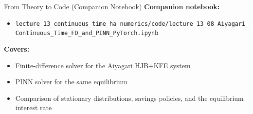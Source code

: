 \documentclass[aspectratio=169,11pt]{beamer}
\begin{document}
\begin{frame}{From Theory to Code (Companion Notebook)}
\footnotesize
\textbf{Companion notebook:}
\begin{itemize}\itemsep2pt
    \item \texttt{lecture\_13\_continuous\_time\_ha\_numerics/code/\allowbreak lecture\_13\_08\_Aiyagari\_Continuous\_Time\_FD\_and\_PINN\_PyTorch.ipynb}
\end{itemize}

\vspace{0.3em}
\textbf{Covers:}
\begin{itemize}\itemsep2pt
    \item Finite-difference solver for the Aiyagari HJB+KFE system
    \item PINN solver for the same equilibrium
    \item Comparison of stationary distributions, savings policies, and the equilibrium interest rate
\end{itemize}
\end{frame}
\end{document}
